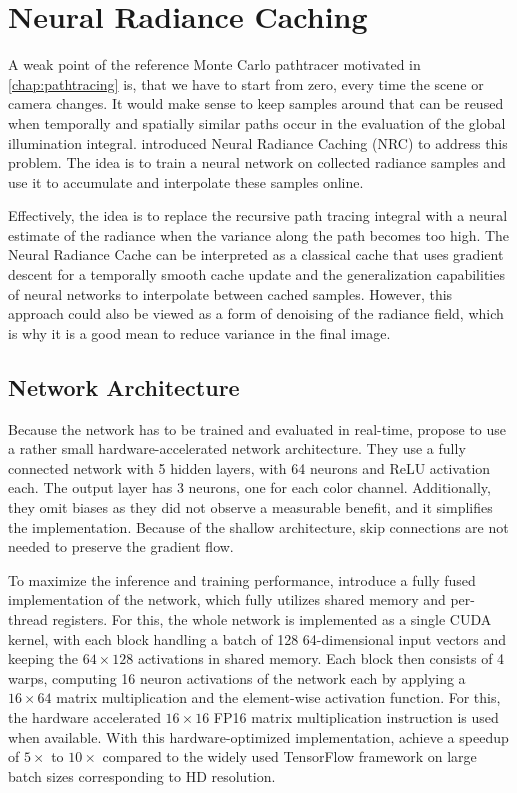 
\chapter{Neural Radiance Caching}
\label{chap:nrc}

A weak point of the reference Monte Carlo pathtracer motivated in \ref{chap:pathtracing} is, that we have to start from zero, every time the scene or camera changes.
It would make sense to keep samples around that can be reused when temporally and spatially similar paths occur in the evaluation of the global illumination integral.
\textcite{muller2021} introduced Neural Radiance Caching (NRC) to address this problem.
The idea is to train a neural network on collected radiance samples and use it to accumulate and interpolate these samples online.

Effectively, the idea is to replace the recursive path tracing integral with a neural estimate of the radiance when the variance along the path becomes too high.
The Neural Radiance Cache can be interpreted as a classical cache that uses gradient descent for a temporally smooth cache update and the generalization capabilities of neural networks to interpolate between cached samples.
However, this approach could also be viewed as a form of denoising of the radiance field, which is why it is a good mean to reduce variance in the final image.

\section{Network Architecture}
Because the network has to be trained and evaluated in real-time, \textcite{muller2021} propose to use a rather small hardware-accelerated network architecture.
They use a fully connected network with 5 hidden layers, with 64 neurons and ReLU activation each.
The output layer has 3 neurons, one for each color channel.
Additionally, they omit biases as they did not observe a measurable benefit, and it simplifies the implementation.
Because of the shallow architecture, skip connections are not needed to preserve the gradient flow.

To maximize the inference and training performance, \textcite{muller2021} introduce a fully fused implementation of the network, which fully utilizes shared memory and per-thread registers.
For this, the whole network is implemented as a single CUDA kernel, with each block handling a batch of 128 64-dimensional input vectors and keeping the $64\times128$ activations in shared memory.
Each block then consists of 4 warps, computing 16 neuron activations of the network each by applying a $16\times64$ matrix multiplication and the element-wise activation function.
For this, the hardware accelerated $16\times16$ FP16 matrix multiplication instruction is used when available.
With this hardware-optimized implementation, \textcite{muller2021} achieve a speedup of $5\times$ to $10\times$ compared to the widely used TensorFlow framework  on large batch sizes corresponding to HD resolution.

